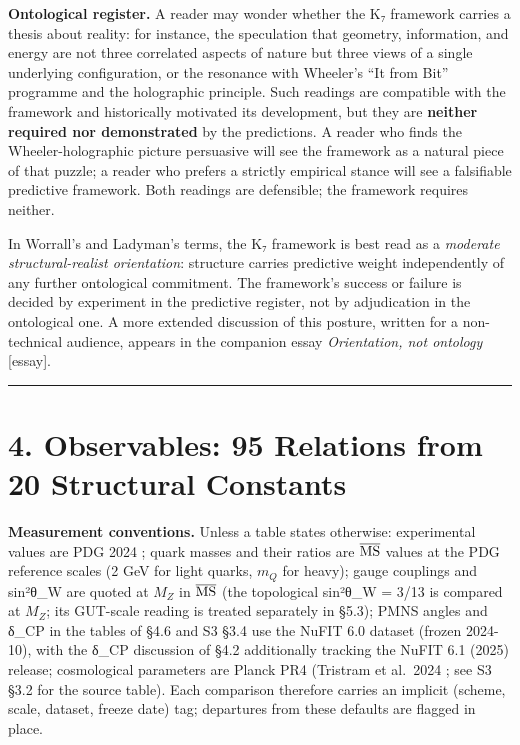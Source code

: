 \documentclass[11pt,a4paper]{article}
\begin{document}
\textbf{Ontological register.} A reader may wonder whether the K₇ framework carries a thesis about reality: for instance, the speculation that geometry, information, and energy are not three correlated aspects of nature but three views of a single underlying configuration, or the resonance with Wheeler's ``It from Bit'' programme \cite{39} and the holographic principle. Such readings are compatible with the framework and historically motivated its development, but they are \textbf{neither required nor demonstrated} by the predictions. A reader who finds the Wheeler-holographic picture persuasive will see the framework as a natural piece of that puzzle; a reader who prefers a strictly empirical stance will see a falsifiable predictive framework. Both readings are defensible; the framework requires neither.

In Worrall's \cite{40} and Ladyman's \cite{41} terms, the K₇ framework is best read as a \emph{moderate structural-realist orientation}: structure carries predictive weight independently of any further ontological commitment. The framework's success or failure is decided by experiment in the predictive register, not by adjudication in the ontological one. A more extended discussion of this posture, written for a non-technical audience, appears in the companion essay \emph{Orientation, not ontology} {[}essay{]}.

\begin{center}\rule{\linewidth}{0.5pt}\end{center}

\section{4. Observables: 95 Relations from 20 Structural Constants}\label{observables-95-relations-from-20-structural-constants}

\textbf{Measurement conventions.} Unless a table states otherwise: experimental values are PDG 2024 \cite{1}; quark masses and their ratios are \(\overline{\rm MS}\) values at the PDG reference scales (2 GeV for light quarks, \(m_Q\) for heavy); gauge couplings and sin²θ\_\allowbreak{}W are quoted at \(M_Z\) in \(\overline{\rm MS}\) (the topological sin²θ\_\allowbreak{}W = 3/13 is compared at \(M_Z\); its GUT-scale reading is treated separately in §5.3); PMNS angles and δ\_\allowbreak{}CP in the tables of §4.6 and S3 §3.4 use the NuFIT 6.0 dataset \cite{27} (frozen 2024-10), with the δ\_\allowbreak{}CP discussion of §4.2 additionally tracking the NuFIT 6.1 (2025) release; cosmological parameters are Planck PR4 (Tristram et al.~2024 \cite{49}; see S3 §3.2 for the source table). Each comparison therefore carries an implicit (scheme, scale, dataset, freeze date) tag; departures from these defaults are flagged in place.
\end{document}

